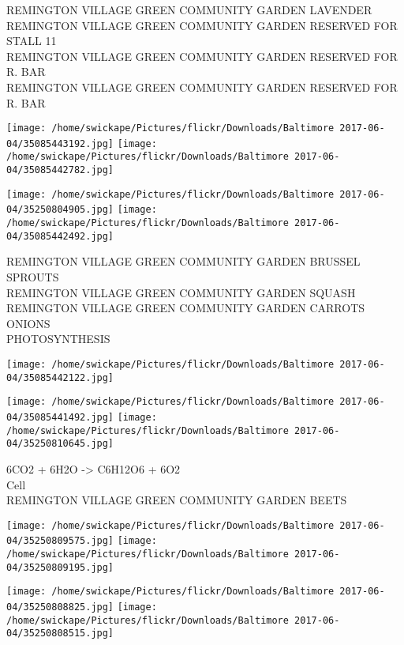 \documentclass[10pt,letterpaper]{article}
\begin{document}
REMINGTON VILLAGE GREEN COMMUNITY GARDEN LAVENDER\\
REMINGTON VILLAGE GREEN COMMUNITY GARDEN RESERVED FOR STALL 11\\
REMINGTON VILLAGE GREEN COMMUNITY GARDEN RESERVED FOR R. BAR\\
REMINGTON VILLAGE GREEN COMMUNITY GARDEN RESERVED FOR R. BAR\\
\pagebreak

\texttt{[image: /home/swickape/Pictures/flickr/Downloads/Baltimore 2017-06-04/35085443192.jpg]}
\texttt{[image: /home/swickape/Pictures/flickr/Downloads/Baltimore 2017-06-04/35085442782.jpg]}

\texttt{[image: /home/swickape/Pictures/flickr/Downloads/Baltimore 2017-06-04/35250804905.jpg]}
\texttt{[image: /home/swickape/Pictures/flickr/Downloads/Baltimore 2017-06-04/35085442492.jpg]}

REMINGTON VILLAGE GREEN COMMUNITY GARDEN BRUSSEL SPROUTS\\
REMINGTON VILLAGE GREEN COMMUNITY GARDEN SQUASH\\
REMINGTON VILLAGE GREEN COMMUNITY GARDEN CARROTS ONIONS\\
PHOTOSYNTHESIS\\
\pagebreak

\texttt{[image: /home/swickape/Pictures/flickr/Downloads/Baltimore 2017-06-04/35085442122.jpg]}

\vspace{0.25in}
\texttt{[image: /home/swickape/Pictures/flickr/Downloads/Baltimore 2017-06-04/35085441492.jpg]}
\texttt{[image: /home/swickape/Pictures/flickr/Downloads/Baltimore 2017-06-04/35250810645.jpg]}

6CO2 + 6H2O {-}> C6H12O6 + 6O2\\
Cell\\
REMINGTON VILLAGE GREEN COMMUNITY GARDEN BEETS\\
\pagebreak

\texttt{[image: /home/swickape/Pictures/flickr/Downloads/Baltimore 2017-06-04/35250809575.jpg]}
\texttt{[image: /home/swickape/Pictures/flickr/Downloads/Baltimore 2017-06-04/35250809195.jpg]}

\texttt{[image: /home/swickape/Pictures/flickr/Downloads/Baltimore 2017-06-04/35250808825.jpg]}
\texttt{[image: /home/swickape/Pictures/flickr/Downloads/Baltimore 2017-06-04/35250808515.jpg]}
\end{document}
